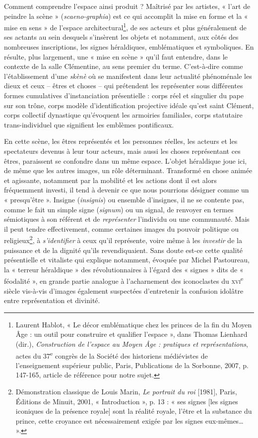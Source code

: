 \documentclass[12pt,twoside,openany]{book}
\begin{document}
Comment comprendre l’espace ainsi produit ? Maîtrisé par les artistes, « l’art de peindre la scène » (\textit{scaeno-graphia}) est ce qui accomplit la mise en forme et la « mise en sens » de l’espace architectural\footnote{Laurent Hablot, « Le décor emblématique chez les princes de la fin du Moyen Âge : un outil pour construire et qualifier l’espace », dans Thomas Lienhard (dir.), \textit{Construction de l’espace au Moyen Âge : pratiques et représentations}, actes du 37\textsuperscript{e} congrès de la Société des historiens médiévistes de l’enseignement supérieur public, Paris, Publications de la Sorbonne, 2007, p. 147-165, article de référence pour notre sujet.}, de ses acteurs et plus généralement de ses actants au sein desquels s’insèrent les objets et notamment, aux côtés des nombreuses inscriptions, les signes héraldiques, emblématiques et symboliques. En résulte, plus largement, une « mise en scène » qu’il faut entendre, dans le contexte de la salle Clémentine, au sens premier du terme. C’est-à-dire comme l’établissement d’une \textit{skènè} où se manifestent dans leur actualité phénoménale les dieux et ceux – êtres et choses – qui prétendent les représenter sous différentes formes cumulatives d’instanciation présentielle : corps réel et singulier du pape sur son trône, corps modèle d’identification projective idéale qu’est saint Clément, corps collectif dynastique qu’évoquent les armoiries familiales, corps statutaire trans-individuel que signifient les emblèmes pontificaux.

En cette scène, les êtres représentés et les personnes réelles, les acteurs et les spectateurs devenus à leur tour acteurs, mais aussi les choses représentant ces êtres, paraissent se confondre dans un même espace. L’objet héraldique joue ici, de même que les autres images, un rôle déterminant. Transformé en chose animée et agissante, notamment par la mobilité et les actions dont il est alors fréquemment investi, il tend à devenir ce que nous pourrions désigner comme un « presqu’être ». Insigne (\textit{insignis}) ou ensemble d’insignes, il ne se contente pas, comme le fait un simple signe (\textit{signum}) ou un signal, de renvoyer en termes sémiotiques à son référent et de \textit{représenter} l’individu ou une communauté. Mais il peut tendre effectivement, comme certaines images du pouvoir politique ou religieux\footnote{Démonstration classique de Louis Marin, \textit{Le portrait du roi} [1981], Paris, Éditions de Minuit, 2001, « Introduction », p. 13 : « ses signes [les signes iconiques de la présence royale] sont la réalité royale, l’être et la substance du prince, cette croyance est nécessairement exigée par les signes eux-mêmes… ».}, à \textit{s’identifier} à ceux qu’il représente, voire même à les \textit{investir }de la puissance et de la dignité qu’ils revendiquaient. Sans doute est-ce cette qualité présentielle et vitaliste qui explique notamment, évoquée par Michel Pastoureau, la « terreur héraldique » des révolutionnaires à l’égard des « signes » dits de « féodalité », en grande partie analogue à l’acharnement des iconoclastes du \textsc{xvi}\textsuperscript{e} siècle vis-à-vis d’images également suspectées d’entretenir la confusion idolâtre entre représentation et divinité.
\end{document}
